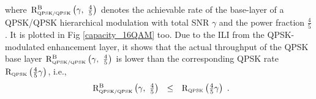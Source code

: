 \documentclass[conference]{IEEEtran}
\begin{document}
\noindent where ${\rm R}_{\mbox{\tiny QPSK/QPSK}}^{\rm
B}\left(\gamma,\ \frac{4}{5}\right)$ denotes the achievable rate
of the base-layer of a QPSK/QPSK hierarchical modulation with
total SNR $\gamma$ and the power fraction $\frac{4}{5}$. It is
plotted in Fig \ref{capacity_16QAM} too. Due to the ILI from the
QPSK-modulated enhancement layer, it shows that the actual
throughput of the QPSK base layer ${\rm R}_{\mbox{\tiny
QPSK/QPSK}}^{\rm B}\left(\gamma,\ \frac{4}{5} \right)$ is lower
than the corresponding QPSK rate ${\rm R}_{\mbox{\tiny
QPSK}}\left(\frac{4}{5}\gamma\right)$, i.e.,
\begin{equation}
\begin{array}{rcl}
{\rm R}_{\mbox{\tiny QPSK/QPSK}}^{\rm B}\left(\gamma,\ \frac{4}{5}
\right)&\leq&{\rm R}_{\mbox{\tiny QPSK}}
\left(\frac{4}{5}\gamma\right)
\end{array}.\label{R_16QAM_B2}
\end{equation}
\begin{figure}
\end{figure}
\end{document}
